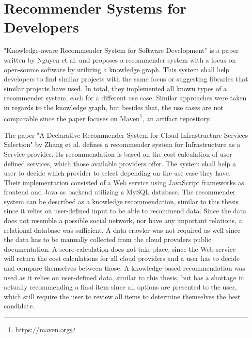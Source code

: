 \section{Recommender Systems for Developers}
\label{sec:rsfd}
"Knowledge-aware Recommender System for Software Development" \cite{Nguyen2018KnowledgeawareRS} is a paper written by Nguyen et al. and proposes a recommender system with a focus on open-source software by utilizing a knowledge graph. This system shall help developers to find similar projects with the same focus or suggesting libraries that similar projects have used. In total, they implemented all known types of a recommender system, each for a different use case. Similar approaches were taken in regards to the knowledge graph, but besides that, the use cases are not comparable since the paper focuses on Maven\footnote{https://maven.org}, an artifact repository.

The paper "A Declarative Recommender System for Cloud Infrastructure Services Selection" \cite{costcalculatorcloud} by Zhang et al. defines a recommender system for Infrastructure as a Service provider. Its recommendation is based on the cost calculation of user-defined services, which those available providers offer. The system shall help a user to decide which provider to select depending on the use case they have. Their implementation consisted of a Web service using JavaScript frameworks as frontend and Java as backend utilizing a MySQL database. The recommender system can be described as a knowledge recommendation, similar to this thesis since it relies on user-defined input to be able to recommend data. Since the data does not resemble a possible social network, nor have any important relations, a relational database was sufficient. A data crawler was not required as well since the data has to be manually collected from the cloud providers public documentation. A score calculation does not take place, since the Web service will return the cost calculations for all cloud providers and a user has to decide and compare themselves between those. A knowledge-based recommendation was used as it relies on user-defined data, similar to this thesis, but has a shortage in actually recommending a final item since all options are presented to the user, which still require the user to review all items to determine themselves the best candidate.

